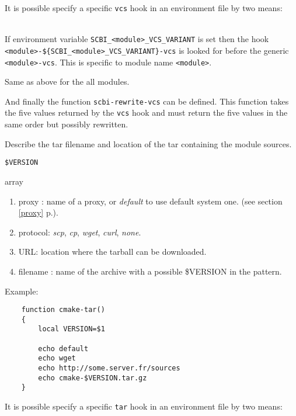 \documentclass[a4paper,12pt,twoside]{article}
\newcommand{\code}[1]{\texttt{#1}}
\renewcommand{\emph}[1]{\textit{#1}}
\newcommand{\seeref}[1]{see section \ref{#1} p.\pageref{#1}}
\begin{document}
\begin{description}[font=\large\texttt]
	It is possible specify a specific \code{vcs} hook in an environment file by two means:

	\begin{description}[style=standard]
		\item[\code{SCBI\_<module>\_VCS\_VARIANT}] \hfill \\
		If environment variable \code{SCBI\_<module>\_VCS\_VARIANT} is set then the hook \\ \code{<module>-\$\{SCBI\_<module>\_VCS\_VARIANT\}-vcs} is looked for before the generic \code{<module>-vcs}. This is specific to module name \code{<module>}.

		\item[\code{SCBI\_VCS\_VARIANT}] Same as above for the all modules.
	\end{description}

	And finally the function \code{scbi-rewrite-vcs} can be defined. This function takes the five values returned by the \code{vcs} hook and must return the five values in the same order but possibly rewritten.

	\item[<module>-tar] Describe the tar filename and location of the tar containing the module sources.
	\begin{description}[font=\textit,style=standard]
		\item[parameter] \tabto{2cm} \code{\$VERSION}
		\item[return] \tabto{2cm} array
		\begin{enumerate}
		\item proxy : name of a proxy, or \emph{default} to use default system one. (\seeref{proxy}).
		\item protocol: \emph{scp}, \emph{cp}, \emph{wget}, \emph{curl}, \emph{none}.
		\item URL: location where the tarball can be downloaded.
		\item filename : name of the archive with a possible \$VERSION in the pattern.
		\end{enumerate}
	\end{description}

	Example:
	\begin{lstlisting}
	function cmake-tar()
	{
		local VERSION=$1

		echo default
		echo wget
		echo http://some.server.fr/sources
		echo cmake-$VERSION.tar.gz
	}
	\end{lstlisting}

	It is possible specify a specific \code{tar} hook in an environment file by two means:


\end{description}
\end{document}
